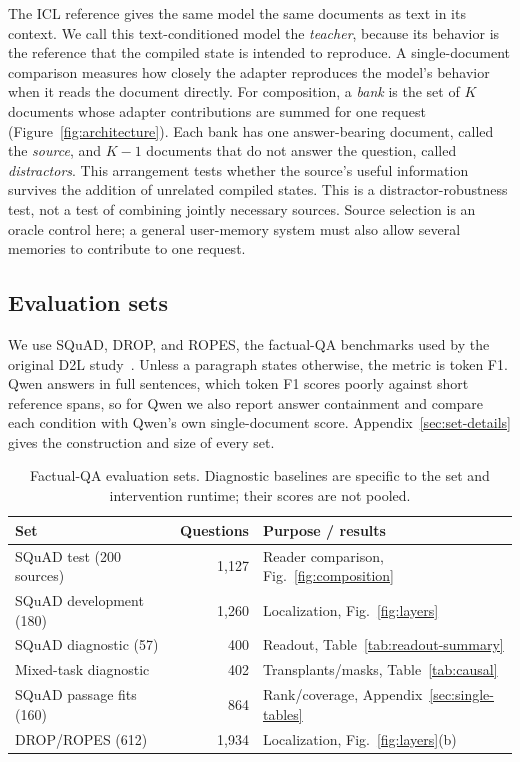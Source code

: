 

The ICL reference gives the same model the same documents as text in its
context. We call this text-conditioned model the \emph{teacher}, because its
behavior is the reference that the compiled state is intended to reproduce. A
single-document comparison measures how closely the adapter reproduces the
model's behavior when it reads the document directly. For composition, a \emph{bank} is
the set of $K$ documents whose adapter contributions are summed for one request
(Figure~\ref{fig:architecture}). Each bank has one answer-bearing document,
called the \emph{source}, and $K-1$ documents that do not answer the question,
called \emph{distractors}. This arrangement tests whether the source's useful
information survives the addition of unrelated compiled states.
This is a distractor-robustness test, not a test of combining jointly necessary
sources. Source selection is an oracle control here; a general user-memory
system must also allow several memories to contribute to one request.

\subsection{Evaluation sets}
\label{sec:suites}

We use SQuAD, DROP, and ROPES, the factual-QA benchmarks used by the original
D2L study~\citep{rajpurkar2016squad,dua2019drop,lin2019ropes,charakorn2026doctolora}.
Unless a paragraph states otherwise, the metric is token F1. Qwen answers in full sentences, which
token F1 scores poorly against short reference spans, so for Qwen we also report
answer containment and compare each condition with Qwen's own single-document
score. Appendix~\ref{sec:set-details} gives the
construction and size of every set.

\begin{table}[t]
\centering
\caption{Factual-QA evaluation sets. Diagnostic baselines are specific to
the set and intervention runtime; their scores are not pooled.}
\label{tab:evaluation-sets}
\scriptsize\setlength{\tabcolsep}{3pt}
\begin{tabular}{@{}lrl@{}}
\toprule
Set & Questions & Purpose / results \\
\midrule
SQuAD test (200 sources) & 1,127 & Reader comparison, Fig.~\ref{fig:composition} \\
SQuAD development (180) & 1,260 & Localization, Fig.~\ref{fig:layers} \\
SQuAD diagnostic (57) & 400 & Readout, Table~\ref{tab:readout-summary} \\
Mixed-task diagnostic & 402 & Transplants/masks, Table~\ref{tab:causal} \\
SQuAD passage fits (160) & 864 & Rank/coverage, Appendix~\ref{sec:single-tables} \\
DROP/ROPES (612) & 1,934 & Localization, Fig.~\ref{fig:layers}(b) \\
\bottomrule
\end{tabular}
\end{table}

